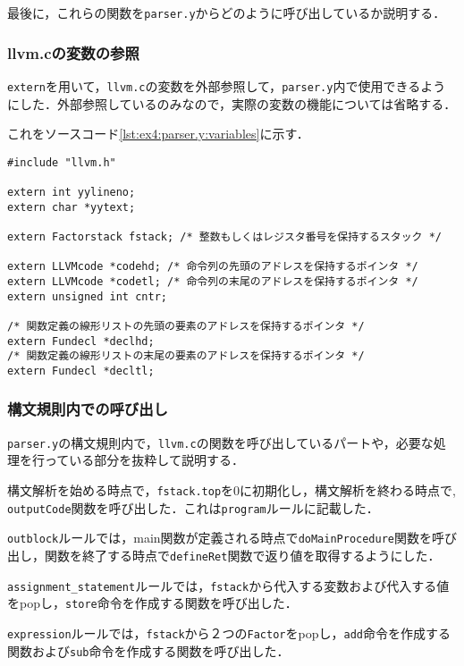 \documentclass[uplatex]{jsarticle}
\begin{document}
最後に，これらの関数を\verb#parser.y#からどのように呼び出しているか説明する．

\subsubsection{llvm.cの変数の参照}
\verb#extern#を用いて，\verb#llvm.c#の変数を外部参照して，\verb#parser.y#内で使用できるようにした．外部参照しているのみなので，実際の変数の機能については省略する．

これをソースコード\ref{lst:ex4:parser.y:variables}に示す．

\begin{lstlisting}[caption=変数の外部参照,label=lst:ex4:parser.y:variables]
#include "llvm.h"

extern int yylineno;
extern char *yytext;

extern Factorstack fstack; /* 整数もしくはレジスタ番号を保持するスタック */

extern LLVMcode *codehd; /* 命令列の先頭のアドレスを保持するポインタ */
extern LLVMcode *codetl; /* 命令列の末尾のアドレスを保持するポインタ */
extern unsigned int cntr;

/* 関数定義の線形リストの先頭の要素のアドレスを保持するポインタ */
extern Fundecl *declhd;
/* 関数定義の線形リストの末尾の要素のアドレスを保持するポインタ */
extern Fundecl *decltl;
\end{lstlisting}

\subsubsection{構文規則内での呼び出し}

\verb#parser.y#の構文規則内で，\verb#llvm.c#の関数を呼び出しているパートや，必要な処理を行っている部分を抜粋して説明する．

構文解析を始める時点で，\verb#fstack.top#を0に初期化し，構文解析を終わる時点で,
\verb#outputCode#関数を呼び出した．これは\verb#program#ルールに記載した．

\verb#outblock#ルールでは，main関数が定義される時点で\verb#doMainProcedure#関数を呼び出し，関数を終了する時点で\verb#defineRet#関数で返り値を取得するようにした．

\verb#assignment_statement#ルールでは，\verb#fstack#から代入する変数および代入する値をpopし，\verb#store#命令を作成する関数を呼び出した．

\verb#expression#ルールでは，\verb#fstack#から２つの\verb#Factor#をpopし，\verb#add#命令を作成する関数および\verb#sub#命令を作成する関数を呼び出した．
\end{document}
